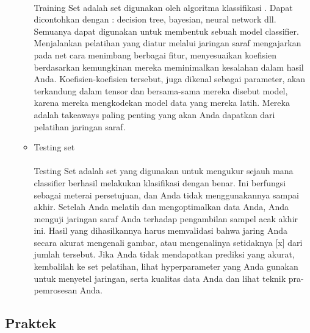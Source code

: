 \begin{enumerate}
\begin{itemize}
				\paragraph{}
				Training Set adalah set digunakan oleh algoritma klassifikasi . Dapat dicontohkan dengan : decision tree, bayesian, neural network dll. Semuanya dapat digunakan untuk membentuk sebuah model classifier. Menjalankan pelatihan yang diatur melalui jaringan saraf mengajarkan pada net cara menimbang berbagai fitur, menyesuaikan koefisien berdasarkan kemungkinan mereka meminimalkan kesalahan dalam hasil Anda. Koefisien-koefisien tersebut, juga dikenal sebagai parameter, akan terkandung dalam tensor dan bersama-sama mereka disebut model, karena mereka mengkodekan model data yang mereka latih. Mereka adalah takeaways paling penting yang akan Anda dapatkan dari pelatihan jaringan saraf.

			\item Testing set
				\paragraph{}
				Testing Set adalah set yang digunakan untuk mengukur sejauh mana classifier berhasil melakukan klasifikasi dengan benar. Ini berfungsi sebagai meterai persetujuan, dan Anda tidak menggunakannya sampai akhir. Setelah Anda melatih dan mengoptimalkan data Anda, Anda menguji jaringan saraf Anda terhadap pengambilan sampel acak akhir ini. Hasil yang dihasilkannya harus memvalidasi bahwa jaring Anda secara akurat mengenali gambar, atau mengenalinya setidaknya [x] dari jumlah tersebut. Jika Anda tidak mendapatkan prediksi yang akurat, kembalilah ke set pelatihan,
				lihat hyperparameter yang Anda gunakan untuk menyetel jaringan, serta kualitas data Anda dan lihat teknik pra-pemrosesan Anda.
				
		\end{itemize}
		
\end{enumerate}


\subsection{Praktek}

